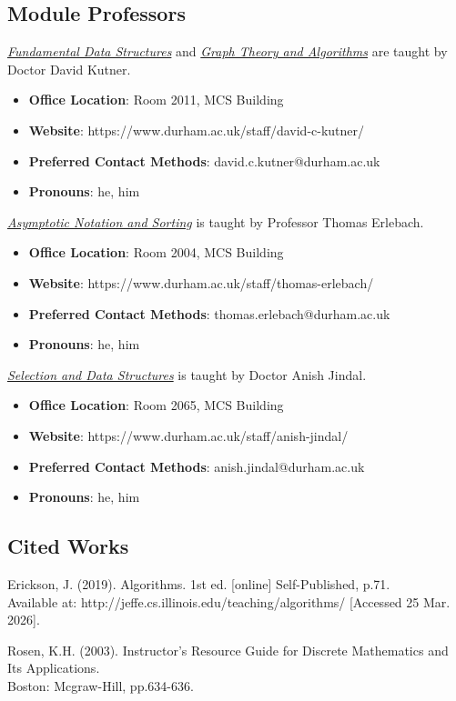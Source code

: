 \subsection{Module Professors}

\hyperref[ads:section:1.fds]{\textit{Fundamental Data Structures}} and \hyperref[ads:section:4.gta]{\textit{Graph Theory and Algorithms}} are taught by Doctor David Kutner.
\begin{itemize}
    \item \textbf{Office Location}: Room 2011, MCS Building
    \item \textbf{Website}: https://www.durham.ac.uk/staff/david-c-kutner/
    \item \textbf{Preferred Contact Methods}: david.c.kutner@durham.ac.uk
    \item \textbf{Pronouns}: he, him
\end{itemize}
    
\hyperref[ads:section:2.ans]{\textit{Asymptotic Notation and Sorting}} is taught by Professor Thomas Erlebach.
\begin{itemize}
    \item \textbf{Office Location}: Room 2004, MCS Building
    \item \textbf{Website}: https://www.durham.ac.uk/staff/thomas-erlebach/
    \item \textbf{Preferred Contact Methods}: thomas.erlebach@durham.ac.uk
    \item \textbf{Pronouns}: he, him
\end{itemize}
    
\hyperref[ads:section:3.sds]{\textit{Selection and Data Structures}} is taught by Doctor Anish Jindal.
\begin{itemize}
    \item \textbf{Office Location}: Room 2065, MCS Building
    \item \textbf{Website}: https://www.durham.ac.uk/staff/anish-jindal/
    \item \textbf{Preferred Contact Methods}: anish.jindal@durham.ac.uk
    \item \textbf{Pronouns}: he, him
\end{itemize}

\subsection{Cited Works}

Erickson, J. (2019). Algorithms. 1st ed. [online] Self-Published, p.71. \\ Available at: http://jeffe.cs.illinois.edu/teaching/algorithms/ [Accessed 25 Mar. 2026].\label{cit:1.algorithms}

Rosen, K.H. (2003). Instructor's Resource Guide for Discrete Mathematics and Its Applications. \\ Boston: Mcgraw-Hill, pp.634-636.\label{cit:2.eulerianCircuits}